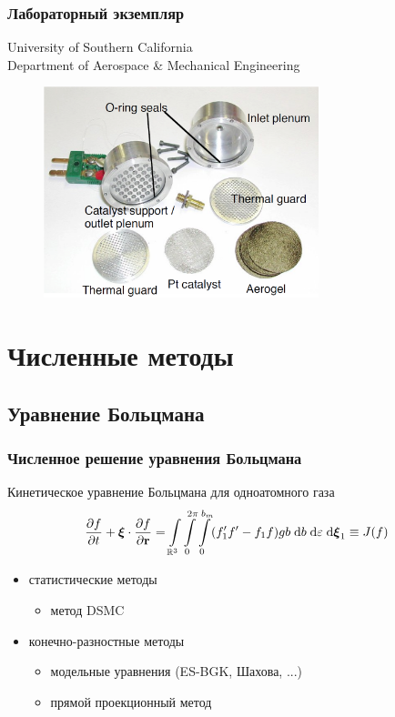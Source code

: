 \documentclass[ucs]{beamer}
\newcommand{\dd}{\;\mathrm{d}}
\begin{document}
\begin{frame}
	\frametitle{Лабораторный экземпляр}
	\begin{center}
		University of Southern California \\
		Department of Aerospace \& Mechanical Engineering
	\end{center}
	\begin{figure}
		\includegraphics[width=8cm]{ModernInv.png}
	\end{figure}
\end{frame}

\section{Численные методы}

\subsection{Уравнение Больцмана}
\begin{frame}
	\frametitle{Численное решение уравнения Больцмана}
	Кинетическое уравнение Больцмана для одноатомного газа
    \[
		{\partial{f} \over \partial{t}} + \boldsymbol{\xi} \cdot {\partial{f} \over \partial\mathbf{r}} =
		\int\limits_{\mathbb R^3} \int\limits_0^{2\pi} \int\limits_0^{b_m}
		(f_1' f' - f_1 f) gb \dd{b} \dd\varepsilon \dd\boldsymbol\xi_1 \equiv J(f)
    \]
	\begin{itemize}
		\item статистические методы
		\begin{itemize}
			\item метод DSMC
		\end{itemize}
		\item конечно-разностные методы
		\begin{itemize}
			\item модельные уравнения (ES-BGK, Шахова, ...)
			\item \alert{прямой проекционный метод}
		\end{itemize}
	\end{itemize}
\end{frame}
\end{document}
